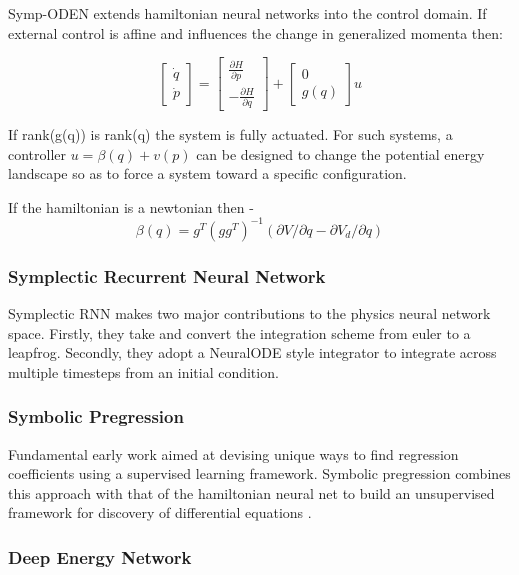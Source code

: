 \documentclass{article}
\begin{document}
Symp-ODEN \cite{zhong_symplectic_2019} extends hamiltonian neural networks into the control domain. If external control is affine and influences the change in generalized momenta then:

$$ 
\begin{bmatrix}
\dot{q} \\
\dot{p}
\end{bmatrix}
= 
\begin{bmatrix}
\frac{\partial H}{\partial p} \\
-\frac{\partial H}{\partial q}
\end{bmatrix}
+
\begin{bmatrix}
0 \\
g(q)
\end{bmatrix} u
$$

If rank(g(q)) is rank(q) the system is fully actuated. For such systems, a controller $u = \beta(q) +v(p) $ can be designed to change the potential energy landscape so as to force a system toward a specific configuration.

If the hamiltonian is a newtonian then - $$ \beta(q) = g^T (gg^T)^{-1} (\partial V/\partial q - \partial V_d/\partial q) $$


\subsubsection{Symplectic Recurrent Neural Network}

Symplectic RNN \cite{chen_symplectic_2020} makes two major contributions to the physics neural network space. Firstly, they take  and convert the integration scheme from euler to a leapfrog. Secondly, they adopt a NeuralODE style integrator to integrate across multiple timesteps from an initial condition.


\subsubsection{Symbolic Pregression}

Fundamental early work aimed at devising unique ways to find regression coefficients using a supervised learning framework. Symbolic pregression combines this approach with that of the hamiltonian neural net to build an unsupervised framework for discovery of differential equations \cite{udrescu_symbolic_2020}.

\subsubsection{Deep Energy Network}
\end{document}
